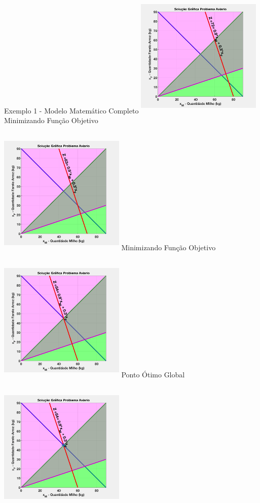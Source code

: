 \documentclass{beamer}
\begin{document}
\begin{frame}
\begin{columns}
\begin{column}{0.8\textwidth}
\begin{exampleblock}{Exemplo 1 - Modelo Matemático Completo}
{					\includegraphics[width=6cm,height=6cm]{MatLab/aviario_14.png}
				}
				\only<17>
				{	
					Minimizando Função Objetivo \\~\\
					\includegraphics[width=6cm,height=6cm]{MatLab/aviario_15.png}
				}
				\only<18>
				{	
					Minimizando Função Objetivo \\~\\
					\includegraphics[width=6cm,height=6cm]{MatLab/aviario_16.png}
				}
				\only<19>
				{	
					Ponto Ótimo Global \\~\\
					\includegraphics[width=6cm,height=6cm]{MatLab/aviario_17.png}
}
\end{exampleblock}
\end{column}
\end{columns}
\end{frame}
\end{document}

